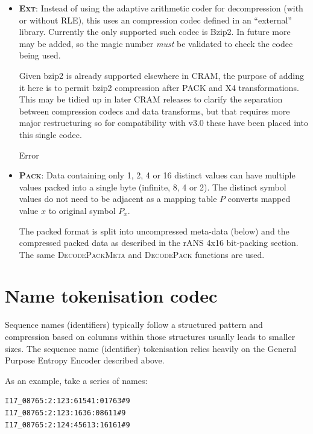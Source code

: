 \documentclass[a4paper]{article}
\begin{document}
\begin{itemize}
\item{\textbf{\textsc{Ext}}:}
Instead of using the adaptive arithmetic coder for decompression (with or without RLE), this uses an compression codec defined in an ``external'' library.
Currently the only supported such codec is Bzip2.
In future more may be added, so the magic number \emph{must} be validated to check the codec being used.

Given bzip2 is already supported elsewhere in CRAM, the purpose of adding it here is to permit bzip2 compression after PACK and X4 transformations.
This may be tidied up in later CRAM releases to clarify the separation between compression codecs and data transforms, but that requires more major restructuring so for compatibility with v3.0 these have been placed into this single codec.

\begin{algorithmic}[1]
    \State \Return {}
  \Else
    \State Error
  \EndIf
\EndFunction
\end{algorithmic}

\item{\textbf{\textsc{Pack}}:}
Data containing only 1, 2, 4 or 16 distinct values can have multiple
values packed into a single byte (infinite, 8, 4 or 2).  The distinct
symbol values do not need to be adjacent as a mapping table $P$
converts mapped value $x$ to original symbol $P_x$.

The packed format is split into uncompressed meta-data (below) and the
compressed packed data as described in the rANS 4x16 bit-packing section.
The same \textsc{DecodePackMeta} and \textsc{DecodePack} functions are used.

\end{itemize}

\section{Name tokenisation codec}

Sequence names (identifiers) typically follow a structured pattern and compression based on columns within those structures usually leads to smaller sizes.
The sequence name (identifier) tokenisation relies heavily on the General Purpose Entropy Encoder described above.

As an example, take a series of names:

\begin{verbatim}
I17_08765:2:123:61541:01763#9
I17_08765:2:123:1636:08611#9
I17_08765:2:124:45613:16161#9
\end{verbatim}
\end{document}
